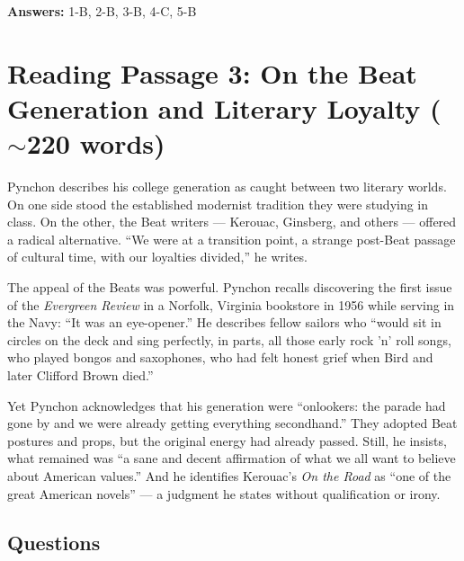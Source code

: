 \documentclass[10pt,a4paper]{article}
\begin{document}
\textbf{Answers:} 1-B, 2-B, 3-B, 4-C, 5-B

\section*{Reading Passage 3: On the Beat Generation and Literary
Loyalty ($\sim$220 words)}

\begin{tcolorbox}[colback=white, colframe=black]
\small
Pynchon describes his college generation as caught between two
literary worlds. On one side stood the established modernist
tradition they were studying in class. On the other, the Beat
writers --- Kerouac, Ginsberg, and others --- offered a radical
alternative. ``We were at a transition point, a strange post-Beat
passage of cultural time, with our loyalties divided,'' he writes.

The appeal of the Beats was powerful. Pynchon recalls discovering
the first issue of the \emph{Evergreen Review} in a Norfolk,
Virginia bookstore in 1956 while serving in the Navy: ``It was an
eye-opener.'' He describes fellow sailors who ``would sit in circles
on the deck and sing perfectly, in parts, all those early rock 'n'
roll songs, who played bongos and saxophones, who had felt honest
grief when Bird and later Clifford Brown died.''

Yet Pynchon acknowledges that his generation were ``onlookers: the
parade had gone by and we were already getting everything
secondhand.'' They adopted Beat postures and props, but the original
energy had already passed. Still, he insists, what remained was ``a
sane and decent affirmation of what we all want to believe about
American values.'' And he identifies Kerouac's \emph{On the Road}
as ``one of the great American novels'' --- a judgment he states
without qualification or irony.
\end{tcolorbox}

\subsection*{Questions}
\end{document}
